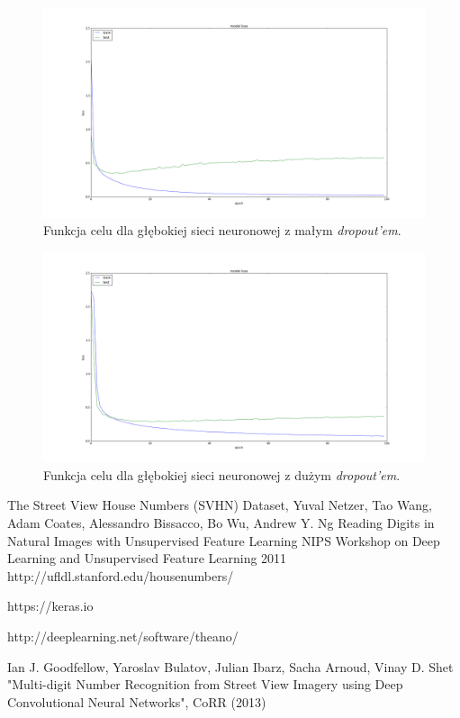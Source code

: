 \documentclass[12pt]{article}
\begin{document}
\begin{figure}[!ht]
\centering
\includegraphics[scale=0.25]{loss_half_dropout}
\caption{Funkcja celu dla głębokiej sieci neuronowej z małym \textit{dropout'em}.}
\label{loss_dropout}
\end{figure}


\begin{figure}[!ht]
\centering
\includegraphics[scale=0.25]{loss_dropout}
\caption{Funkcja celu dla głębokiej sieci neuronowej z dużym \textit{dropout'em}.}
\label{loss_dropout}
\end{figure}

\begin{thebibliography}{9}

The Street View House Numbers (SVHN) Dataset,
Yuval Netzer, Tao Wang, Adam Coates, Alessandro Bissacco, Bo Wu, Andrew Y. Ng
Reading Digits in Natural Images with Unsupervised Feature Learning NIPS Workshop on Deep Learning and Unsupervised Feature Learning
2011
http://ufldl.stanford.edu/housenumbers/

https://keras.io

http://deeplearning.net/software/theano/

Ian J. Goodfellow, Yaroslav Bulatov, Julian Ibarz, Sacha Arnoud, Vinay D. Shet
"Multi-digit Number Recognition from Street View Imagery using Deep Convolutional Neural Networks",
CoRR (2013)


\end{thebibliography}
\end{document}
